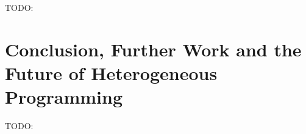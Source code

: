 \documentclass[a4paper,12pt,twoside,openright]{report}
\begin{document}
TODO:


\chapter{Conclusion, Further Work and the Future of Heterogeneous Programming}



TODO:

\appendix
\singlespacing



\end{document}
